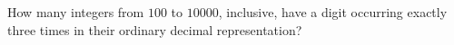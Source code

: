 How many integers from $100$ to $10000$, inclusive, have a digit occurring exactly three times in their ordinary decimal representation?
